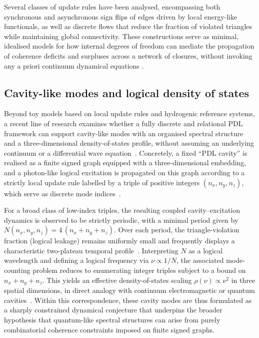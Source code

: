\documentclass[11pt,a4paper]{article}
\begin{document}
Several classes of update rules have been analysed, encompassing both synchronous and asynchronous sign flips of edges driven by local energy‑like functionals, as well as discrete flows that reduce the fraction of violated triangles while maintaining global connectivity. These constructions serve as minimal, idealised models for how internal degrees of freedom can mediate the propagation of coherence deficits and surpluses across a network of closures, without invoking any a priori continuum dynamical equations \citep{Coherence_Leakage_18_2026}.

\subsection{Cavity-like modes and logical density of states}
\label{subsec:cavity_modes}

Beyond toy models based on local update rules and hydrogenic reference systems, a recent line of research examines whether a fully discrete and relational PDL framework can support cavity-like modes with an organised spectral structure and a three-dimensional density-of-states profile, without assuming an underlying continuum or a differential wave equation~\citep{Effective_Fields_PDL_2026,PDLCavityModes2026}. Concretely, a fixed “PDL cavity” is realised as a finite signed graph equipped with a three-dimensional embedding, and a photon-like logical excitation is propagated on this graph according to a strictly local update rule labelled by a triple of positive integers $(n_x,n_y,n_z)$, which serve as discrete mode indices~\citep{PDLCavityModes2026}.

For a broad class of low-index triples, the resulting coupled cavity–excitation dynamics is observed to be strictly periodic, with a minimal period given by $N(n_x,n_y,n_z)=4\,(n_x+n_y+n_z)$. Over each period, the triangle-violation fraction (logical leakage) remains uniformly small and frequently displays a characteristic two-plateau temporal profile~\citep{PDLCavityModes2026}. Interpreting $N$ as a logical wavelength and defining a logical frequency via $\nu\propto 1/N$, the associated mode-counting problem reduces to enumerating integer triples subject to a bound on $n_x+n_y+n_z$. This yields an effective density-of-states scaling $\rho(\nu)\propto \nu^2$ in three spatial dimensions, in direct analogy with continuum electromagnetic or quantum cavities~\citep{PDLCavityModes2026}. Within this correspondence, these cavity modes are thus formulated as a sharply constrained dynamical conjecture that underpins the broader hypothesis that quantum-like spectral structures can arise from purely combinatorial coherence constraints imposed on finite signed graphs.
\end{document}
